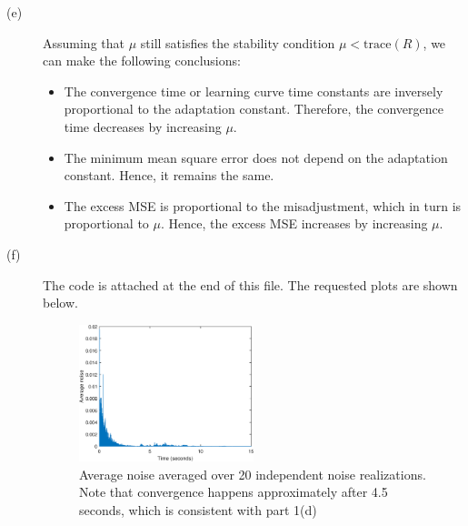 \documentclass{article}
\begin{document}
\begin{description}
\item[(e)]
Assuming that $\mu$ still satisfiesthe stability condition $\mu < \mathrm{trace}(R)$, we can make the following conclusions:
\begin{itemize}
	\item The convergence time or learning curve time constants are inversely proportional to the adaptation constant. Therefore, the convergence time decreases by increasing $\mu$.
	\item The minimum mean square error does not depend on the adaptation constant. Hence, it remains the same.
	\item The excess MSE is proportional to the misadjustment, which in turn is proportional to $\mu$. Hence, the excess MSE increases by increasing $\mu$.
\end{itemize}

\item[(f)] 
The code is attached at the end of this file. The requested plots are shown below.

\begin{figure}
	\centering
	\includegraphics[width=0.5\textwidth]{figs/part1_average_noise.eps}
	\caption{Average noise averaged over 20 independent noise realizations. Note that convergence happens approximately after 4.5 seconds, which is consistent with part 1(d)}
\end{figure}


\end{description}
\end{document}
